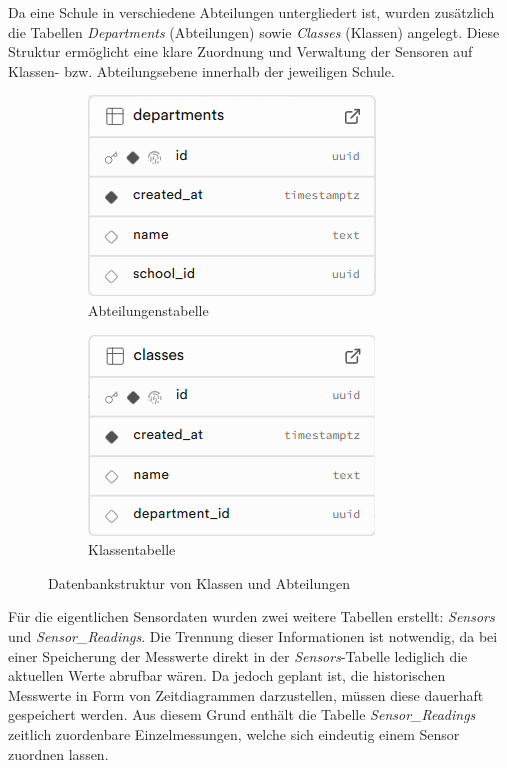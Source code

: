 \begin{inhalt}
\newpage

Da eine Schule in verschiedene Abteilungen untergliedert ist, wurden zusätzlich die Tabellen \textit{Departments} (Abteilungen) sowie \textit{Classes} (Klassen) angelegt. Diese Struktur ermöglicht eine klare Zuordnung und Verwaltung der Sensoren auf Klassen- bzw. Abteilungsebene innerhalb der jeweiligen Schule.

\begin{figure}[!htb]
  \centering
  \begin{subfigure}[b]{0.45\textwidth}
    \centering
    \includegraphics[scale=0.45]{files/Thomas/pics/Datenbank_Design/departments.png}
    \caption[Tabelle Departments]{Abteilungenstabelle}
    \label{fig:departments_tabelle}
  \end{subfigure}
  \hfill
  \begin{subfigure}[b]{0.45\textwidth}
    \centering
    \includegraphics[scale=0.45]{files/Thomas/pics/Datenbank_Design/classes.png}
    \caption[Tabelle Classes]{Klassentabelle}
    \label{fig:classes_tabelle}
  \end{subfigure}
  \caption[Abteilungs- und Klassentabellen]{Datenbankstruktur von Klassen und Abteilungen}
  \label{fig:departments_classes}
\end{figure}

Für die eigentlichen Sensordaten wurden zwei weitere Tabellen erstellt: \textit{Sensors} und \textit{Sensor\_Readings}. Die Trennung dieser Informationen ist notwendig, da bei einer Speicherung der Messwerte direkt in der \textit{Sensors}-Tabelle lediglich die aktuellen Werte abrufbar wären. Da jedoch geplant ist, die historischen Messwerte in Form von Zeitdiagrammen darzustellen, müssen diese dauerhaft gespeichert werden. Aus diesem Grund enthält die Tabelle \textit{Sensor\_Readings} zeitlich zuordenbare Einzelmessungen, welche sich eindeutig einem Sensor zuordnen lassen.


\end{inhalt}

